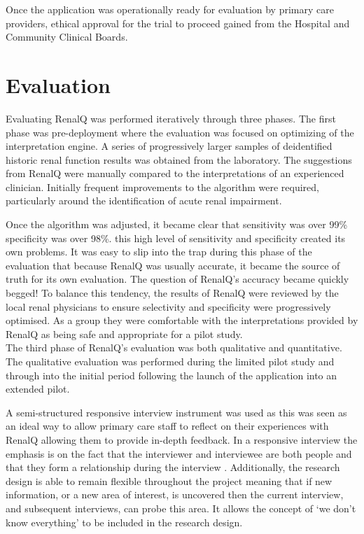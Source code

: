 \documentclass[11pt]{article}
\begin{document}
Once the application was operationally ready for evaluation by primary care providers, ethical approval for the trial to proceed gained from the Hospital and Community Clinical Boards. \\

\section{Evaluation}

Evaluating RenalQ was performed iteratively through three phases. The first phase was pre-deployment where the evaluation was focused on optimizing of the interpretation engine. A series of progressively larger samples of deidentified historic renal function results was obtained from the laboratory. The suggestions from RenalQ were manually compared to the interpretations of an experienced clinician. Initially frequent improvements to the algorithm were required, particularly around the identification of acute renal impairment. 

Once the algorithm was adjusted, it became clear that sensitivity was over 99\% specificity was over 98\%. this high level of sensitivity and specificity created its own problems. It was easy to slip into the trap during this phase of the evaluation that because RenalQ was usually accurate, it became the source of truth for its own evaluation. The question of RenalQ's accuracy became quickly begged! To balance this tendency, the results of RenalQ were reviewed by the local renal physicians to ensure selectivity and specificity were progressively optimised. As a group they were comfortable with the interpretations provided by RenalQ as being safe and appropriate for a pilot study. \\ 

The third phase of RenalQ's evaluation was both qualitative and quantitative. The qualitative evaluation was performed during the limited pilot study and through into the initial period following the launch of the application into an extended pilot. 

A semi-structured responsive interview instrument was used as this was seen as an ideal way to allow primary care staff to reflect on their experiences with RenalQ allowing them to provide in-depth feedback. In a responsive interview the emphasis is on the fact that the interviewer and interviewee are both people and that they form a relationship during the interview \citep{rubin2011qualitative}. Additionally, the research design is able to remain flexible throughout the project meaning that if new information, or a new area of interest, is uncovered then the current interview, and subsequent interviews, can probe this area. It allows the concept of ‘we don’t know everything’ to be included in the research design.\\
\end{document}
